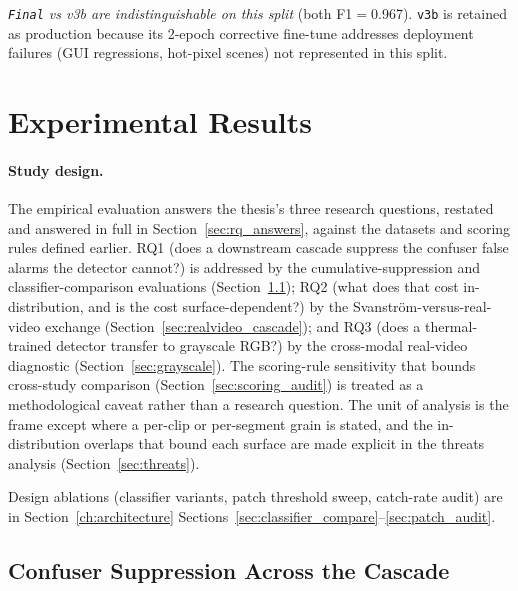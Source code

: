 \emph{\texttt{Final} vs v3b are indistinguishable on this split} (both F1$=$0.967). \texttt{v3b} is retained as production because its 2-epoch corrective fine-tune addresses deployment failures (GUI regressions, hot-pixel scenes) not represented in this split.

\section{Experimental Results}
\label{ch:experiments}

\paragraph{Study design.}
The empirical evaluation answers the thesis's three research questions, restated and answered in full in Section~\ref{sec:rq_answers}, against the datasets and scoring rules defined earlier. RQ1 (does a downstream cascade suppress the confuser false alarms the detector cannot?) is addressed by the cumulative-suppression and classifier-comparison evaluations (Section~\ref{sec:cumulative}); RQ2 (what does that cost in-distribution, and is the cost surface-dependent?) by the Svanstr\"om-versus-real-video exchange (Section~\ref{sec:realvideo_cascade}); and RQ3 (does a thermal-trained detector transfer to grayscale RGB?) by the cross-modal real-video diagnostic (Section~\ref{sec:grayscale}). The scoring-rule sensitivity that bounds cross-study comparison (Section~\ref{sec:scoring_audit}) is treated as a methodological caveat rather than a research question. The unit of analysis is the frame except where a per-clip or per-segment grain is stated, and the in-distribution overlaps that bound each surface are made explicit in the threats analysis (Section~\ref{sec:threats}).

Design ablations (classifier variants, patch threshold sweep, catch-rate audit) are in Section~\ref{ch:architecture} Sections~\ref{sec:classifier_compare}--\ref{sec:patch_audit}.

\subsection{Confuser Suppression Across the Cascade}
\label{sec:cumulative}

